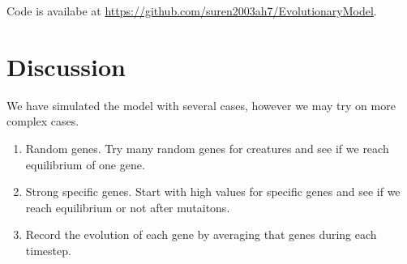\documentclass{article}
\begin{document}
Code is availabe at \href{https://github.com/suren2003ah7/EvolutionaryModel}{https://github.com/suren2003ah7/EvolutionaryModel}.
\section{Discussion}
We have simulated the model with several cases, however we may try on more complex cases.

\begin{enumerate}
    \item Random genes. Try many random genes for creatures and see if we reach equilibrium of one gene.
    \item Strong specific genes. Start with high values for specific genes and see if we reach equilibrium or not after mutaitons.
    \item Record the evolution of each gene by averaging that genes during each timestep.
\end{enumerate}
\nocite{*}


\end{document}
